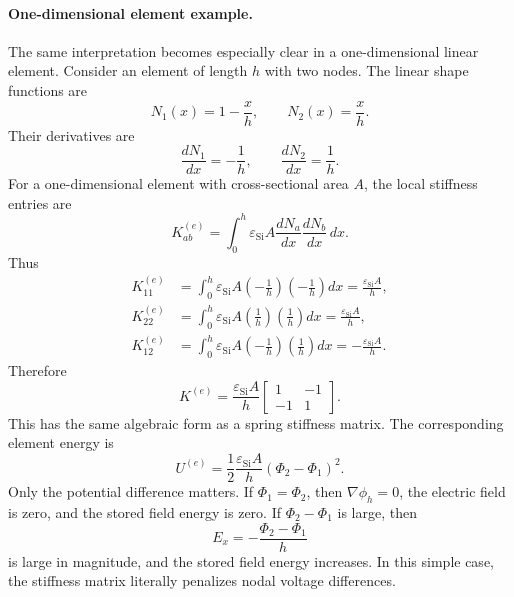 \documentclass[11pt]{article}
\begin{document}
\paragraph{One-dimensional element example.}
The same interpretation becomes especially clear in a one-dimensional linear element. Consider an element of length $h$ with two nodes. The linear shape functions are
\begin{equation}
N_1(x)=1-\frac{x}{h},
\qquad
N_2(x)=\frac{x}{h}.
\end{equation}
Their derivatives are
\begin{equation}
\frac{dN_1}{dx}=-\frac{1}{h},
\qquad
\frac{dN_2}{dx}=\frac{1}{h}.
\end{equation}
For a one-dimensional element with cross-sectional area $A$, the local stiffness entries are
\begin{equation}
K_{ab}^{(e)}
= \int_0^h \varepsilon_{\mathrm{Si}} A
\frac{dN_a}{dx}\frac{dN_b}{dx}\, dx.
\end{equation}
Thus
\begin{align}
K_{11}^{(e)}
&= \int_0^h \varepsilon_{\mathrm{Si}} A
\left(-\frac{1}{h}\right)
\left(-\frac{1}{h}\right) dx
= \frac{\varepsilon_{\mathrm{Si}} A}{h}, \\
K_{22}^{(e)}
&= \int_0^h \varepsilon_{\mathrm{Si}} A
\left(\frac{1}{h}\right)
\left(\frac{1}{h}\right) dx
= \frac{\varepsilon_{\mathrm{Si}} A}{h}, \\
K_{12}^{(e)}
&= \int_0^h \varepsilon_{\mathrm{Si}} A
\left(-\frac{1}{h}\right)
\left(\frac{1}{h}\right) dx
= -\frac{\varepsilon_{\mathrm{Si}} A}{h}.
\end{align}
Therefore
\begin{equation}
\boxed{
K^{(e)}
= \frac{\varepsilon_{\mathrm{Si}} A}{h}
\begin{bmatrix}
1 & -1 \\
-1 & 1
\end{bmatrix}.
}
\end{equation}
This has the same algebraic form as a spring stiffness matrix. The corresponding element energy is
\begin{equation}
\boxed{
U^{(e)}
= \frac{1}{2}\frac{\varepsilon_{\mathrm{Si}} A}{h}
\left(\Phi_2-\Phi_1\right)^2.
}
\end{equation}
Only the potential difference matters. If $\Phi_1=\Phi_2$, then $\nabla \phi_h=0$, the electric field is zero, and the stored field energy is zero. If $\Phi_2-\Phi_1$ is large, then
\begin{equation}
E_x
= -\frac{\Phi_2-\Phi_1}{h}
\end{equation}
is large in magnitude, and the stored field energy increases. In this simple case, the stiffness matrix literally penalizes nodal voltage differences.
\end{document}
